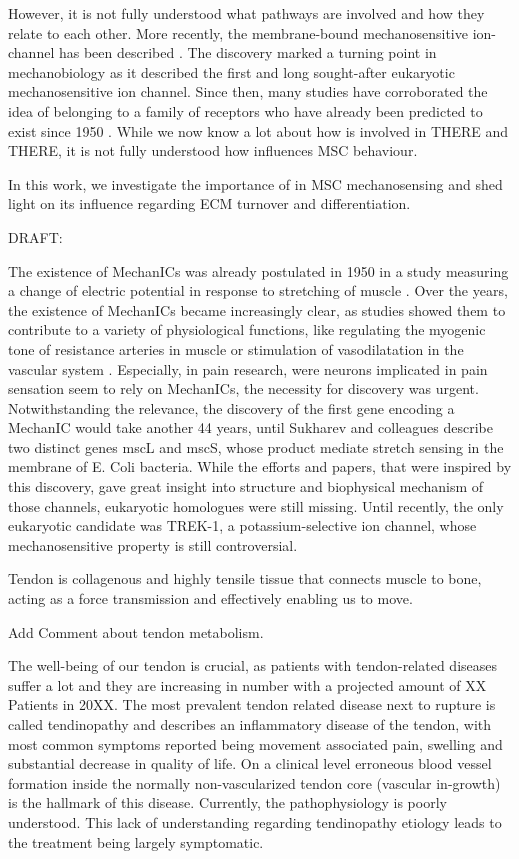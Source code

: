 However, it is not fully understood what pathways are involved and how they relate to each other.  More recently, the membrane-bound mechanosensitive ion-channel \Piezo{} has been described \cite{Coste2010}. The discovery marked a turning point in mechanobiology as it described the first and long sought-after eukaryotic mechanosensitive ion channel. \cite{Sharif-Naeini2015} Since then, many studies have corroborated the idea of \Piezo{} belonging to a family of receptors who have already been predicted to exist since 1950 \cite{Katz1949}. While we now know a lot about how \Piezo{} is involved in THERE and THERE, it is not fully understood how \Piezo{} influences MSC behaviour. \par
In this work, we investigate the importance of \Piezo{} in MSC mechanosensing and shed light on its influence regarding ECM turnover and differentiation.


DRAFT: 


The existence of MechanICs was already postulated in 1950 in a study measuring a change of electric potential in response to stretching of muscle \cite{Katz1949}. Over the years, the existence of MechanICs became increasingly clear, as studies showed them to contribute to a variety of physiological functions, like regulating the myogenic tone of resistance arteries in muscle \cite{Murthy2017} or stimulation of vasodilatation in the vascular system \cite{Zeng2018}. Especially, in pain research, were neurons implicated in pain sensation seem to rely on MechanICs, the necessity for discovery was urgent. Notwithstanding the relevance, the discovery of the first gene encoding a MechanIC would take another 44 years, until Sukharev and colleagues describe two distinct genes mscL and mscS, whose product mediate stretch sensing in the membrane of E. Coli bacteria. While the efforts and papers, that were inspired by this discovery, gave great insight into structure and biophysical mechanism of those channels, eukaryotic homologues were still missing. Until recently, the only eukaryotic candidate was TREK-1, a potassium-selective ion channel, whose mechanosensitive property is still controversial. 

Tendon is collagenous and highly tensile tissue that connects muscle to bone, acting as a force transmission and effectively enabling us to move. 

Add Comment about tendon metabolism. 

The well-being of our tendon is crucial, as patients with tendon-related diseases suffer a lot and they are increasing in number with a projected amount of XX Patients in 20XX. The most prevalent tendon related disease next to rupture is called tendinopathy and describes an inflammatory disease of the tendon, with most common symptoms reported being movement associated pain, swelling and substantial decrease in quality of life. On a clinical level erroneous blood vessel formation inside the normally non-vascularized tendon core (vascular in-growth) is the hallmark of this disease. Currently, the pathophysiology is poorly understood. This lack of understanding regarding tendinopathy etiology leads to the treatment being largely symptomatic. 

